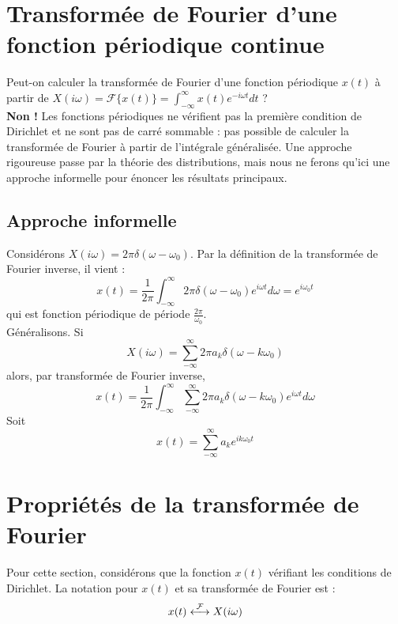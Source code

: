 \section{Transformée de Fourier d'une fonction périodique continue}
Peut-on calculer la transformée de Fourier d'une fonction périodique 
$x(t)$ à partir de $X(i\omega) = \mathcal{F}\{x(t)\} = \int_{-\infty}
^\infty x(t)e^{-i\omega t}dt$ ?\\
\textbf{Non !} Les fonctions périodiques ne vérifient pas la première 
condition de Dirichlet et ne sont pas de carré sommable : pas possible 
de calculer la transformée de Fourier à partir de l’intégrale généralisée.
Une approche rigoureuse passe par la théorie des distributions, mais nous
ne ferons qu'ici une approche informelle pour énoncer les résultats 
principaux.

\subsection{Approche informelle}
Considérons $X(i\omega) = 2\pi\delta(\omega-\omega_0)$. Par la 
définition de la transformée de Fourier inverse, il vient :
\begin{equation}
	x(t) = \frac{1}{2\pi}\int_{-\infty}^\infty 2\pi\delta(\omega-
	\omega_0)e^{i\omega t}d\omega = e^{i\omega_0 t}
\end{equation}
qui est fonction périodique de période $\frac{2\pi}{\omega_0}$.\\
Généralisons. Si 
\begin{equation}
	X(i\omega) = \sum_{-\infty}^\infty 2\pi a_k\delta(\omega-k\omega_0)
\end{equation}
alors, par transformée de Fourier inverse,
\begin{equation}
	x(t) = \frac{1}{2\pi}\int_{-\infty}^\infty \sum_{-\infty}^\infty 2\pi 
	a_k\delta(\omega-k\omega_0)e^{i\omega t}d\omega
\end{equation}
Soit
\begin{equation}
	x(t) = \sum_{-\infty}^\infty a_ke^{ik\omega_0t}
\end{equation}
	
\section{Propriétés de la transformée de Fourier}
Pour cette section, considérons que la fonction $x(t)$ vérifiant les 
conditions de Dirichlet. La notation pour $x(t)$ et sa transformée de 
Fourier est :
\begin{equation}
	x(t) \ft X(i\omega)
\end{equation}

